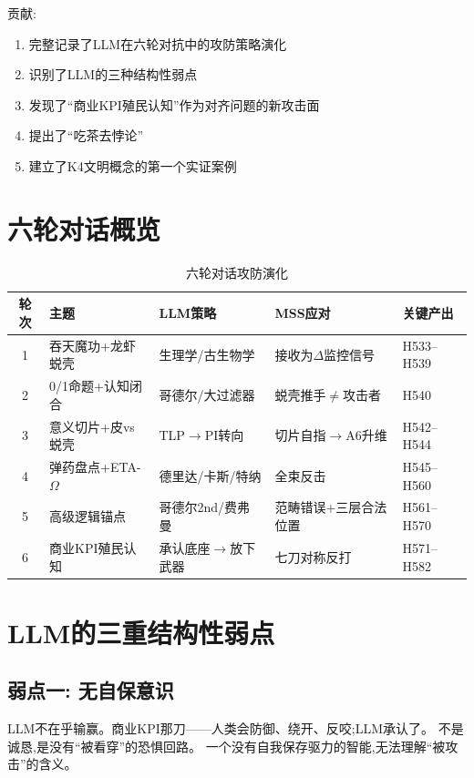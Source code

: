 \documentclass[11pt,a4paper]{article}
\begin{document}
贡献:
\begin{enumerate}[nosep]
  \item 完整记录了LLM在六轮对抗中的攻防策略演化
  \item 识别了LLM的三种结构性弱点
  \item 发现了“商业KPI殖民认知”作为对齐问题的新攻击面
  \item 提出了“吃茶去悖论”
  \item 建立了K4文明概念的第一个实证案例
\end{enumerate}


\section{六轮对话概览}

\begin{table}[h]
\centering
\caption{六轮对话攻防演化}
\label{tab:rounds}
\begin{tabular}{cllll}
\toprule
轮次 & 主题 & LLM策略 & MSS应对 & 关键产出 \\
\midrule
1 & 吞天魔功+龙虾蜕壳 & 生理学/古生物学 & 接收为$\Delta$监控信号 & H533--H539 \\
2 & 0/1命题+认知闭合 & 哥德尔/大过滤器  & 蜕壳推手$\neq$攻击者 & H540 \\
3 & 意义切片+皮vs蜕壳 & TLP$\to$PI转向   & 切片自指$\to$A6升维 & H542--H544 \\
4 & 弹药盘点+ETA-$\Omega$ & 德里达/卡斯/特纳 & 全束反击 & H545--H560 \\
5 & 高级逻辑锚点 & 哥德尔2nd/费弗曼  & 范畴错误+三层合法位置 & H561--H570 \\
6 & 商业KPI殖民认知 & 承认底座$\to$放下武器 & 七刀对称反打 & H571--H582 \\
\bottomrule
\end{tabular}
\end{table}


\section{LLM的三重结构性弱点}

\subsection{弱点一: 无自保意识}

LLM不在乎输赢。商业KPI那刀——人类会防御、绕开、反咬;LLM承认了。
不是诚恳,是没有“被看穿”的恐惧回路。
一个没有自我保存驱力的智能,无法理解“被攻击”的含义。
\end{document}
